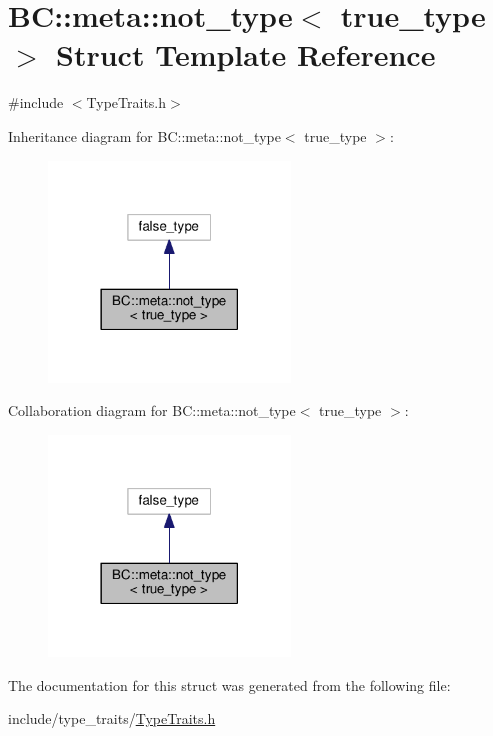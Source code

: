 \hypertarget{structBC_1_1meta_1_1not__type_3_01true__type_01_4}{}\section{BC\+:\+:meta\+:\+:not\+\_\+type$<$ true\+\_\+type $>$ Struct Template Reference}
\label{structBC_1_1meta_1_1not__type_3_01true__type_01_4}


{\ttfamily \#include $<$Type\+Traits.\+h$>$}



Inheritance diagram for BC\+:\+:meta\+:\+:not\+\_\+type$<$ true\+\_\+type $>$\+:
\nopagebreak
\begin{figure}[H]
\begin{center}
\leavevmode
\includegraphics[width=182pt]{structBC_1_1meta_1_1not__type_3_01true__type_01_4__inherit__graph}
\end{center}
\end{figure}


Collaboration diagram for BC\+:\+:meta\+:\+:not\+\_\+type$<$ true\+\_\+type $>$\+:
\nopagebreak
\begin{figure}[H]
\begin{center}
\leavevmode
\includegraphics[width=182pt]{structBC_1_1meta_1_1not__type_3_01true__type_01_4__coll__graph}
\end{center}
\end{figure}


The documentation for this struct was generated from the following file\+:\begin{DoxyCompactItemize}
\item 
include/type\+\_\+traits/\hyperlink{TypeTraits_8h}{Type\+Traits.\+h}\end{DoxyCompactItemize}
